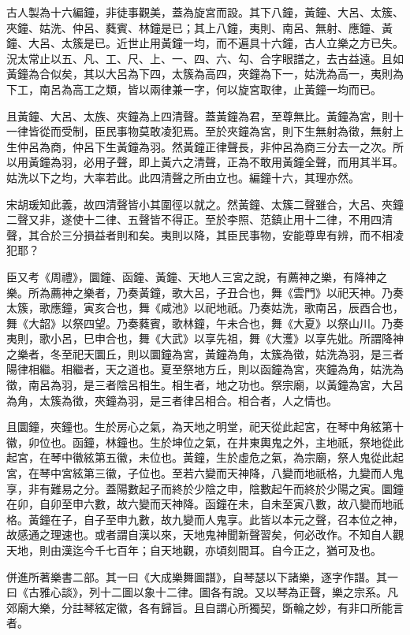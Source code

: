 古人製為十六編鐘，非徒事觀美，蓋為旋宮而設。其下八鐘，黃鐘、大呂、太簇、夾鐘、姑洗、仲呂、蕤賓、林鐘是已；其上八鐘，夷則、南呂、無射、應鐘、黃鐘、大呂、太簇是已。近世止用黃鐘一均，而不遍具十六鐘，古人立樂之方已失。況太常止以五、凡、工、尺、上、一、四、六、勾、合字眼譜之，去古益遠。且如黃鐘為合似矣，其以大呂為下四，太簇為高四，夾鐘為下一，姑洗為高一，夷則為下工，南呂為高工之類，皆以兩律兼一字，何以旋宮取律，止黃鐘一均而已。

且黃鐘、大呂、太族、夾鐘為上四清聲。蓋黃鐘為君，至尊無比。黃鐘為宮，則十一律皆從而受制，臣民事物莫敢凌犯焉。至於夾鐘為宮，則下生無射為徵，無射上生仲呂為商，仲呂下生黃鐘為羽。然黃鐘正律聲長，非仲呂為商三分去一之次。所以用黃鐘為羽，必用子聲，即上黃六之清聲，正為不敢用黃鐘全聲，而用其半耳。姑洗以下之均，大率若此。此四清聲之所由立也。編鐘十六，其理亦然。

宋胡瑗知此義，故四清聲皆小其圍徑以就之。然黃鐘、太簇二聲雖合，大呂、夾鐘二聲又非，遂使十二律、五聲皆不得正。至於李照、范鎮止用十二律，不用四清聲，其合於三分損益者則和矣。夷則以降，其臣民事物，安能尊卑有辨，而不相凌犯耶？

臣又考《周禮》，圜鐘、函鐘、黃鐘、天地人三宮之說，有薦神之樂，有降神之樂。所為薦神之樂者，乃奏黃鐘，歌大呂，子丑合也，舞《雲門》以祀天神。乃奏太簇，歌應鐘，寅亥合也，舞《咸池》以祀地祇。乃奏姑洗，歌南呂，辰酉合也，舞《大韶》以祭四望。乃奏蕤賓，歌林鐘，午未合也，舞《大夏》以祭山川。乃奏夷則，歌小呂，巳申合也，舞《大武》以享先祖，舞《大濩》以享先妣。所謂降神之樂者，冬至祀天圜丘，則以圜鐘為宮，黃鐘為角，太簇為徵，姑洗為羽，是三者陽律相繼。相繼者，天之道也。夏至祭地方丘，則以函鐘為宮，夾鐘為角，姑洗為徵，南呂為羽，是三者陰呂相生。相生者，地之功也。祭宗廟，以黃鐘為宮，大呂為角，太簇為徵，夾鐘為羽，是三者律呂相合。相合者，人之情也。

且圜鐘，夾鐘也。生於房心之氣，為天地之明堂，祀天從此起宮，在琴中角絃第十徽，卯位也。函鐘，林鐘也。生於坤位之氣，在井東輿鬼之外，主地祇，祭地從此起宮，在琴中徽絃第五徽，未位也。黃鐘，生於虛危之氣，為宗廟，祭人鬼從此起宮，在琴中宮絃第三徽，子位也。至若六變而天神降，八變而地祇格，九變而人鬼享，非有難易之分。蓋陽數起子而終於少陰之申，陰數起午而終於少陽之寅。圜鐘在卯，自卯至申六數，故六變而天神降。函鐘在未，自未至寅八數，故八變而地祇格。黃鐘在子，自子至申九數，故九變而人鬼享。此皆以本元之聲，召本位之神，故感通之理速也。或者謂自漢以來，天地鬼神聞新聲習矣，何必改作。不知自人觀天地，則由漢迄今千七百年；自天地觀，亦頃刻間耳。自今正之，猶可及也。

併進所著樂書二部。其一曰《大成樂舞圖譜》，自琴瑟以下諸樂，逐字作譜。其一曰《古雅心談》，列十二圖以象十二律。圖各有說。又以琴為正聲，樂之宗系。凡郊廟大樂，分註琴絃定徽，各有歸旨。且自謂心所獨契，斲輪之妙，有非口所能言者。

